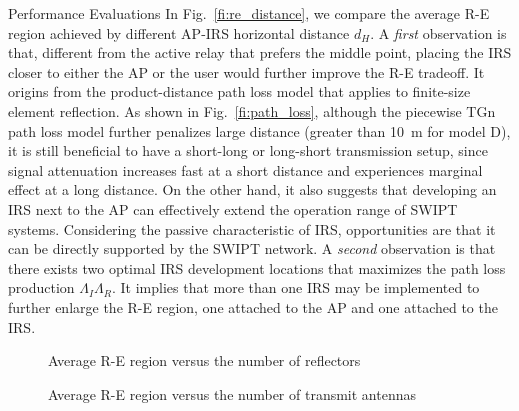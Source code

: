 \documentclass[journal]{IEEEtran}
\begin{document}
\begin{section}{Performance Evaluations}
		In Fig.~\ref{fi:re_distance}, we compare the average R-E region achieved by different AP-IRS horizontal distance $d_H$. A \textit{first} observation is that, different from the active relay that prefers the middle point, placing the IRS closer to either the AP or the user would further improve the R-E tradeoff. It origins from the product-distance path loss model that applies to finite-size element reflection. As shown in Fig.~\ref{fi:path_loss}, although the piecewise TGn path loss model further penalizes large distance (greater than \SI{10}{\meter} for model D), it is still beneficial to have a short-long or long-short transmission setup, since signal attenuation increases fast at a short distance and experiences marginal effect at a long distance. On the other hand, it also suggests that developing an IRS next to the AP can effectively extend the operation range of SWIPT systems. Considering the passive characteristic of IRS, opportunities are that it can be directly supported by the SWIPT network. A \textit{second} observation is that there exists two optimal IRS development locations that maximizes the path loss production $\Lambda_I\Lambda_R$. It implies that more than one IRS may be implemented to further enlarge the R-E region, one attached to the AP and one attached to the IRS.

		\begin{figure}[!t]
			\centering
			\begin{adjustbox}{width=\linewidth}
				
			\end{adjustbox}
			\caption{Average R-E region versus the number of reflectors}
			\label{fi:re_reflector}
		\end{figure}

		\begin{figure}[!t]
			\centering
			\begin{adjustbox}{width=\linewidth}
				
			\end{adjustbox}
			\caption{Average R-E region versus the number of transmit antennas}
			\label{fi:re_tx}
		\end{figure}


\end{section}
\end{document}
